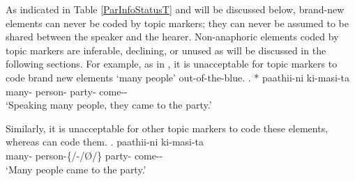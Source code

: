 As indicated in Table \ref{ParInfoStatusT} and will be discussed below,
brand-new elements can never be coded by topic markers;
they can never be assumed to be shared between the speaker and the hearer.
Non-anaphoric elements coded by topic markers are
inferable, declining, or unused
as will be discussed in the following sections.
For example,
as in \Next,
it is unacceptable for topic markers to code brand new elements  `many people' out-of-the-blue.
%
\exg.
 *  paathii-ni ki-masi-ta \\
  many- person- party- come-- \\
  `Speaking many people, they came to the party.'
    \hfill{\cite[~45]{kuno73}}

Similarly, it is unacceptable for other topic markers to code these elements, whereas  can code them.
%
\exg.
   paathii-ni ki-masi-ta \\
 many- person-{\{/-/{\O}/\}} party- come-- \\
 `Many people came to the party.'



